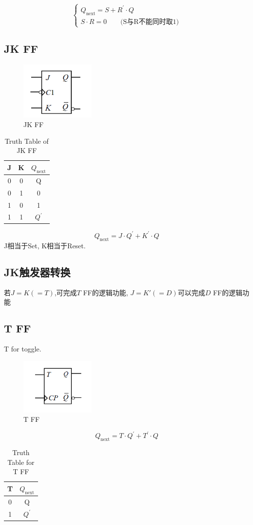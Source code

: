 \documentclass[scheme=chinese,a4paper]{report}
\begin{document}
$$
\begin{cases}
    Q_\text{next}=S+R ^\prime\cdot Q\\
    S\cdot R=0 \qquad \text{(S与R不能同时取1)}
\end{cases}
$$

\subsection{JK FF}
\begin{figure}[H]
\centering
\includegraphics[width=0.33\textwidth]{jk_ff.png}
\caption{JK FF}
\end{figure}

\begin{table}[htb]
    \centering
    \caption{Truth Table of JK FF}
      \begin{tabular}{cc|c}
      \multicolumn{1}{l}{J} & \multicolumn{1}{l}{K} & $Q_\text{next}$ \\
      \hline
      0     & 0     & Q \\
      0     & 1     & 0\\
      1     & 0     & 1\\
      1     & 1     & $Q ^\prime$ \\
      \end{tabular}%
  \end{table}%
$$Q_\text{next}=J\cdot Q ^\prime+K ^\prime\cdot Q$$
J相当于Set, K相当于Reset. 
\subsection{JK触发器转换}
若$J=K(=T)$,可完成$T$ FF的逻辑功能, $J=K'(=D)$可以完成$D$ FF的逻辑功能
\subsection{T FF}
T for toggle. 
\begin{figure}[H]
\centering
\includegraphics[width=0.33\textwidth]{t_ff.png}
\caption{T FF}
\end{figure}
$$Q_\text{next}=T\cdot Q ^\prime+ T ^\prime \cdot Q$$
\begin{table}
    \centering
    \caption{Truth Table for T FF}
    \begin{tabular}{c|c}
        T&$Q_\text{next}$\\
        \hline
        0&Q\\
        1&$Q ^\prime$\\
    \end{tabular}
\end{table}
\end{document}

